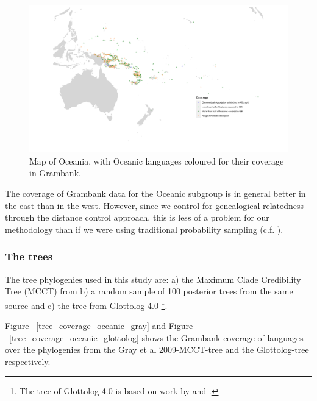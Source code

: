 \documentclass[a4paper,10pt]{article} %
\begin{document}
\newpage

\newpage

\begin{figure}
\centering
\includegraphics[width=\textwidth]{illustrations/plots_from_R/coverage_plots/maps/coverage_map_oceanic.png}
\caption{{Map of Oceania, with Oceanic languages coloured for their coverage in Grambank.}}
\label{GB_austro_coverage}
\end{figure} %

The coverage of Grambank data for the Oceanic subgroup is in general better in the east than in the west. However, since we control for genealogical relatedness through the distance control approach, this is less of a problem for our methodology than if we were using traditional probability sampling (c.f. \citet{ross2004morphosyntactic}).

\subsubsection{The trees}
The tree phylogenies used in this study are: a) the Maximum Clade Credibility Tree (MCCT) from \citet{grayetal_2009} b) a random sample of 100 posterior trees from the same source and c) the tree from Glottolog 4.0 \footnote{The tree of Glottolog 4.0 \citep{glottolog40} is based on work by \citet{blust_2009, blust_2014} and \citet{blust_chen_2017}.}. 

Figure ~\ref{tree_coverage_oceanic_gray} and Figure ~\ref{tree_coverage_oceanic_glottolog} shows the Grambank coverage of languages over the phylogenies from the Gray et al 2009-MCCT-tree and the Glottolog-tree respectively. 
\end{document}
